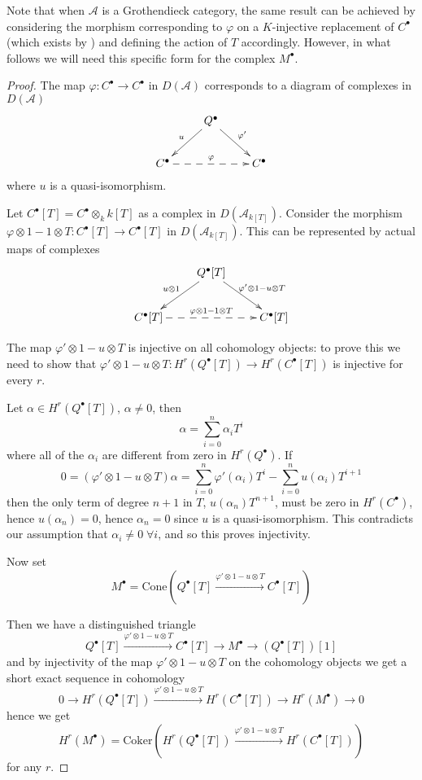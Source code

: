\documentclass{amsart}
\begin{document}
Note that when $\mathcal{A}$ is a Grothendieck category, the same result can be achieved by considering the morphism corresponding to $\varphi$ on a $K$-injective replacement of $C^{\bullet}$ (which exists by \cite[Prop. 3.2]{brown}) and defining the action of $T$ accordingly. However, in what follows we will need this specific form for the complex $M^{\bullet}$.

\begin{proof}
The map $\varphi: C^{\bullet}{\rightarrow} C^{\bullet}$ in $D(\mathcal{A})$ corresponds to a diagram of complexes in $D(\mathcal{A})$
$$\xymatrix{
&Q^{\bullet} \ar[dl]_{u} \ar[dr]^{\varphi'} \\
C^{\bullet} \ar@{-->}[rr]^-{\varphi} & &C^{\bullet} 
}$$
where $u$ is a quasi-isomorphism.

Let $C^{\bullet}[T]=C^{\bullet}\otimes_{k}k[T]$ as a complex in $D(\mathcal{A}_{k[T]})$. Consider the morphism $\varphi \otimes 1 - 1 \otimes T: C^{\bullet}[T] {\rightarrow} C^{\bullet}[T]$ in $D(\mathcal{A}_{k[T]})$. This can be represented by actual maps of complexes
$$\xymatrix{
&Q^{\bullet}[T] \ar[dl]_{u\otimes 1} \ar[dr]^{\varphi' \otimes 1 - u \otimes T} \\
C^{\bullet}[T] \ar@{-->}[rr]^{\varphi \otimes 1 - 1 \otimes T} & &C^{\bullet} [T]
}$$

The map $\varphi' \otimes 1 - u \otimes T$ is injective on all cohomology objects: to prove this we need to show that $\varphi' \otimes 1 - u \otimes T:H^{r}(Q^{\bullet}[T]){\rightarrow} H^{r}(C^{\bullet}[T])$ is injective for every $r$.

Let $\alpha \in H^{r}(Q^{\bullet}[T])$, $\alpha\neq 0$, then
$$\alpha=\sum_{i=0}^{n}\alpha_{i} T^{i}$$
where all of the $\alpha_{i}$ are different from zero in $H^{r}(Q^{\bullet})$. If 
$$0=(\varphi' \otimes 1 - u \otimes T)\alpha= \sum_{i=0}^{n}\varphi'(\alpha_{i}) T^{i}-\sum_{i=0}^{n}u(\alpha_{i})T^{i+1}$$
then the only term of degree $n+1$ in $T$, $u(\alpha_{n})T^{n+1}$, must be zero in $H^{r}(C^{\bullet})$, hence $u(\alpha_{n})=0$, hence $\alpha_{n}=0$ since $u$ is a quasi-isomorphism. This contradicts our assumption that $\alpha_{i}\neq 0\;\forall i$, and so this proves injectivity.

Now set
$$
M^\bullet
=
\text{Cone}
(Q^\bullet[T] \xrightarrow{\varphi' \otimes 1 - u \otimes T} C^\bullet[T])
$$

Then we have a distinguished triangle
\begin{equation}\label{triangle1}
Q^\bullet[T]
\xrightarrow{\varphi' \otimes 1 - u \otimes T}
C^\bullet[T]
\longrightarrow M^\bullet
\longrightarrow (Q^\bullet[T])[1]
\end{equation}
and by injectivity of the map $\varphi' \otimes 1 - u \otimes T$ on the cohomology objects we get a short exact sequence in cohomology
$$0{\rightarrow} H^{r}(Q^{\bullet}[T])\xrightarrow{\varphi' \otimes 1 - u \otimes T}H^{r}(C^{\bullet}[T])\longrightarrow H^{r}(M^{\bullet}){\rightarrow} 0$$
hence we get 
$$H^{r}(M^{\bullet})=\text{Coker}( H^{r}(Q^{\bullet}[T])\xrightarrow{\varphi' \otimes 1 - u \otimes T}H^{r}(C^{\bullet}[T]))$$
for any $r$.


\end{proof}
\end{document}

